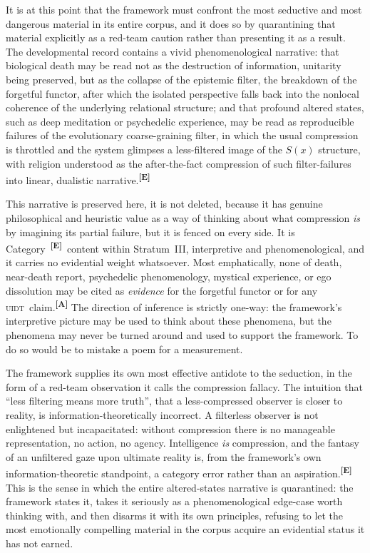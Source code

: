 \documentclass[12pt,a4paper,twoside]{article}
\theoremstyle{plain}
\theoremstyle{definition}
\theoremstyle{remark}
\newcommand{\UIDT}{\textsc{uidt}}
\newcommand{\catmark}[1]{\textsuperscript{\textsf{\textbf{[#1]}}}}
\begin{document}
It is at this point that the framework must confront the most seductive and most dangerous material in its entire corpus, and it does so by quarantining that material explicitly as a red-team caution rather than presenting it as a result. The developmental record contains a vivid phenomenological narrative: that biological death may be read not as the destruction of information, unitarity being preserved, but as the collapse of the epistemic filter, the breakdown of the forgetful functor, after which the isolated perspective falls back into the nonlocal coherence of the underlying relational structure; and that profound altered states, such as deep meditation or psychedelic experience, may be read as reproducible failures of the evolutionary coarse-graining filter, in which the usual compression is throttled and the system glimpses a less-filtered image of the $S(x)$ structure, with religion understood as the after-the-fact compression of such filter-failures into linear, dualistic narrative.\catmark{E}

This narrative is preserved here, it is not deleted, because it has genuine philosophical and heuristic value as a way of thinking about what compression \emph{is} by imagining its partial failure, but it is fenced on every side. It is Category~\catmark{E}\ content within Stratum~III, interpretive and phenomenological, and it carries no evidential weight whatsoever. Most emphatically, none of death, near-death report, psychedelic phenomenology, mystical experience, or ego dissolution may be cited as \emph{evidence} for the forgetful functor or for any \UIDT\ claim.\catmark{A} The direction of inference is strictly one-way: the framework's interpretive picture may be used to think about these phenomena, but the phenomena may never be turned around and used to support the framework. To do so would be to mistake a poem for a measurement.

The framework supplies its own most effective antidote to the seduction, in the form of a red-team observation it calls the compression fallacy. The intuition that ``less filtering means more truth'', that a less-compressed observer is closer to reality, is information-theoretically incorrect. A filterless observer is not enlightened but incapacitated: without compression there is no manageable representation, no action, no agency. Intelligence \emph{is} compression, and the fantasy of an unfiltered gaze upon ultimate reality is, from the framework's own information-theoretic standpoint, a category error rather than an aspiration.\catmark{E} This is the sense in which the entire altered-states narrative is quarantined: the framework states it, takes it seriously as a phenomenological edge-case worth thinking with, and then disarms it with its own principles, refusing to let the most emotionally compelling material in the corpus acquire an evidential status it has not earned.
\end{document}
